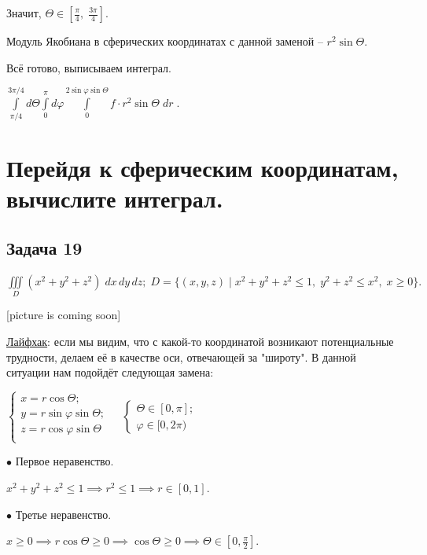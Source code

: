 \documentclass[a4paper, fleqn]{article}
\begin{document}
    Значит, $\Theta \in \left[ \frac{\pi}{4}, \; \frac{3\pi}{4} \right].$
    
    Модуль Якобиана в сферических координатах с данной заменой -- $r^2 \sin \Theta.$
    
    Всё готово, выписываем интеграл.
    
    $\boxed{\displaystyle
    \int \limits_{\pi/4}^{3 \pi /4} d \Theta \int \limits_{0}^{\pi} d \varphi \int \limits_{0}^{2 \sin \varphi \sin \Theta} f \cdot r^2 \sin \Theta \; dr} \; .$
    
    \section*{Перейдя к сферическим координатам, вычислите интеграл.}
    
    
    \subsection*{Задача 19}
    
    $\displaystyle \iiint\limits_{D} (x^2 + y^2 + z^2) \; dx \, dy\, dz; \; D = \{(x,y,z) \mid x^2 + y^2 + z^2 \leq 1, \; y^2 + z^2 \leq x^2, \; x \geq 0 \}. $
    
    [picture is coming soon]
    
    \underline{Лайфхак}: если мы видим, что с какой-то координатой возникают потенциальные трудности, делаем её в качестве оси, отвечающей за "широту". В данной ситуации нам подойдёт следующая замена:
    
    $\begin{cases}
    x = r \cos \Theta;\\
    y = r \sin  \varphi \sin  \Theta;\\
    z = r \cos  \varphi \sin  \Theta \\
    \end{cases} \; \; \; \; 
    \begin{cases}
    \Theta \in [0,\pi];\\
    \varphi \in [0, 2 \pi)
    \end{cases}$
    
    $\bullet$ Первое неравенство.
    
    $x^2 + y^2 + z^2 \leq 1 \implies r^2 \leq 1 \implies r \in [0,1].$
    
    $\bullet$ Третье неравенство.
    
    $x \geq 0 \implies r \cos \Theta \geq 0 \implies \cos \Theta \geq 0 \implies \Theta \in \left[0, \frac{\pi}{2}\right]. $
    
\end{document}
